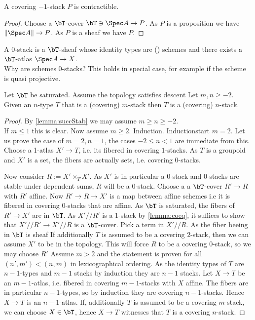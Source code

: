 \begin{lemma}
	A covering $-1$-stack $P$ is contractible.
\end{lemma}
\begin{proof}
	Choose a $\bT$-cover $\bT \ni \Spec A \to P$. As $P$ is a proposition we have $\| \Spec A\| \to P$. As $P$ is a sheaf we have $P$.
\end{proof}
\begin{example}
	A  0-stack is a $\bT$-sheaf whose identity types are  (\affineA) schemes and there exists a $\bT$-atlas $\Spec A \to X$. \\
	Why are schemes  0-stacks? This holds in special case, for example if the scheme is quasi projective. 
\end{example}
\begin{theorem}{\label{thm:stack}}
	Let $\bT$ be saturated. Assume the topology satisfies descent Let $m , n \ge -2$. Given an $n$-type $T$ that is a  (covering) $m$-stack then $T$ is a  (covering) $n$-stack.
\end{theorem}


\begin{proof}
	
	By \ref{lemma:succStab} we may assume $m \ge n \ge -2$. \\
	If $m \le 1$ this is clear. Now assume $m \ge 2$. 
	Induction. 
	Inductionstart $m = 2$. Let us prove the case of $m = 2,n=1$, the cases $-2 \le n<1$ are immediate from this. \\
	Choose a 1-atlas $X' \to T$, i.e. its fibered in covering $1$-stacks. As $T$ is a groupoid and $X'$ is a set, the fibers are actually sets, i.e. covering 0-stacks. 
	
	Now consider $R := X' \times_T X'$. As $X'$ is in particular a  0-stack and  0-stacks are stable under dependent sums, $R$ will be a  0-stack. Choose a  a $\bT$-cover $R' \to R$ with $R'$ affine. Now $R' \to R \to X'$ is a map between affine schemes i.e it is fibered in covering 0-stacks that are affine. As $\bT$ is saturated, the fibers of $R' \to X'$ are in $\bT$. As $X' // R'$ is a  1-stack by \ref{lemma:coeq}, it suffices to show that $X' // R' \to X' // R$ is a $\bT$-cover. Pick a term in $X' // R$. As the fiber beeing in $\bT$ is sheaf 
	If additionally $T$ is assumed to be a covering $2$-stack, then we can assume $X'$ to be in the topology. This will force $R$ to be a covering $0$-stack, so we may choose $R'$
	Assume $m > 2$ and the statement is proven for all $(n',m') < (n,m)$ in lexicographical ordering. As the identity types of $T$ are $n-1$-types and  $m-1$ stacks by induction they are  $n-1$ stacks. Let $X \to T$ be an $m-1$-atlas, i.e. fibered in covering $m-1$-stacks with $X$ affine. The fibers are in particular $n-1$-types, so by induction they are covering $n-1$-stacks. Hence $X \to T$ is an $n-1$-atlas. If, additionally $T$ is assumed to be a covering $m$-stack, we can choose $X \in \bT$, hence $X \to T$ witnesses that $T$ is a covering $n$-stack.
	
\end{proof}


